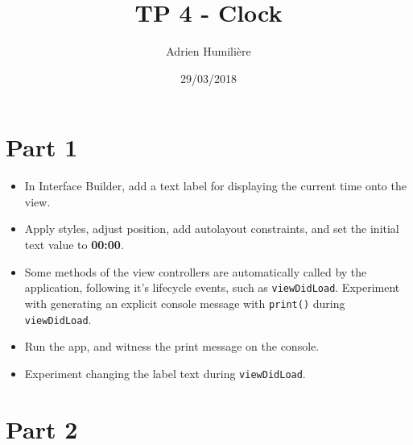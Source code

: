 \documentclass[a4paper,11pt]{scrartcl}
\begin{document}
\newcommand{\mytitle}{TP 4 - Clock}
\title{\mytitle}
\author{Adrien Humilière}
\date{29/03/2018}

\maketitle

\section*{Part 1}

\begin{itemize}
\item In Interface Builder, add a text label for displaying the current time onto the view.
\item Apply styles, adjust position, add autolayout constraints, and set the initial text value to \textbf{00:00}.
\item Some methods of the view controllers are automatically called by the application, following it's lifecycle events, such as \texttt{viewDidLoad}. Experiment with generating an explicit console message with \texttt{print()} during \texttt{viewDidLoad}.
\item Run the app, and witness the print message on the console.
\item Experiment changing the label text during \texttt{viewDidLoad}.
\end{itemize}

\section*{Part 2}
\end{document}
